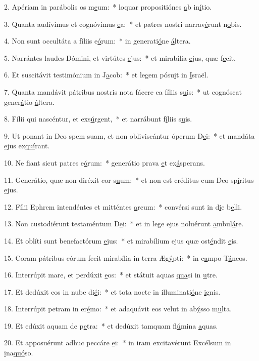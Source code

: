 2. Apériam in parábolis os m\uline{e}um:~* loquar propositiónes \uline{a}b in\uline{í}tio.\par 
3. Quanta audívimus et cognóvimus \uline{e}a:~* et patres nostri narrav\uline{é}runt n\uline{o}bis.\par 
4. Non sunt occultáta a fíliis e\uline{ó}rum:~* in generati\uline{ó}ne \uline{á}ltera.\par 
5. Narrántes laudes Dómini, et virtútes \uline{e}jus:~* et mirabília \uline{e}jus, quæ f\uline{e}cit.\par 
6. Et suscitávit testimónium in J\uline{a}cob:~* et legem pósu\uline{i}t in \uline{I}sraël.\par 
7. Quanta mandávit pátribus nostris nota fácere ea fíliis s\uline{u}is:~* ut cognóscat gener\uline{á}tio \uline{á}ltera.\par 
8. Fílii qui nascéntur, et exs\uline{ú}rgent,~* et narrábunt f\uline{í}liis s\uline{u}is.\par 
9. Ut ponant in Deo spem suam, et non obliviscántur óperum D\uline{e}i:~* et mandáta \uline{e}jus ex\uline{quí}rant.\par 
10. Ne fiant sicut patres e\uline{ó}rum:~* generátio prava \uline{e}t ex\uline{á}sperans.\par 
11. Generátio, quæ non diréxit cor s\uline{u}um:~* et non est créditus cum Deo sp\uline{í}ritus \uline{e}jus.\par 
12. Fílii Ephrem intendéntes et mitténtes \uline{a}rcum:~* convérsi sunt in d\uline{i}e b\uline{e}lli.\par 
13. Non custodiérunt testaméntum D\uline{e}i:~* et in lege ejus noluérunt \uline{a}mbul\uline{á}re.\par 
14. Et oblíti sunt benefactórum \uline{e}jus:~* et mirabílium ejus quæ ost\uline{é}ndit \uline{e}is.\par 
15. Coram pátribus eórum fecit mirabília in terra Æg\uline{ý}pti:~* in c\uline{a}mpo T\uline{á}neos.\par 
16. Interrúpit mare, et perdúxit \uline{e}os:~* et státuit aquas \uline{qua}si in \uline{u}tre.\par 
17. Et dedúxit eos in nube di\uline{é}i:~* et tota nocte in illuminati\uline{ó}ne \uline{i}gnis.\par 
18. Interrúpit petram in er\uline{é}mo:~* et adaquávit eos velut in ab\uline{ý}sso m\uline{u}lta.\par 
19. Et edúxit aquam de p\uline{e}tra:~* et dedúxit tamquam fl\uline{ú}mina \uline{a}quas.\par 
20. Et apposuérunt adhuc peccáre \uline{e}i:~* in iram excitavérunt Excélsum in \uline{i}na\uline{quó}so.\par 
